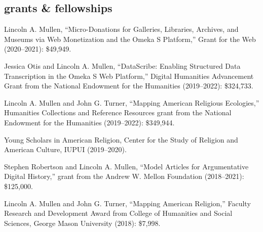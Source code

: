 \documentclass[11pt]{article}
\begin{document}


% 

\subsection{grants \& fellowships}\label{grants-and-fellowships}


Lincoln A. Mullen, ``Micro-Donations for Galleries, Libraries, Archives, and Museums via Web Monetization and the Omeka S Platform,'' Grant for the Web (2020--2021): \$49,949.

Jessica Otis and Lincoln A. Mullen, ``DataScribe: Enabling Structured Data Transcription in the Omeka S Web
Platform,'' Digital Humanities Advancement Grant from the National Endowment for the Humanities (2019--2022): \$324,733.

Lincoln A. Mullen and John G. Turner, ``Mapping American Religious Ecologies,'' Humanities Collections and Reference Resources grant from the National Endowment for the Humanities (2019--2022): \$349,944.

Young Scholars in American Religion, Center for the Study of Religion and American Culture, IUPUI (2019--2020).

Stephen Robertson and Lincoln A. Mullen, ``Model Articles for Argumentative Digital History,'' grant from the Andrew W. Mellon Foundation (2018--2021): \$125,000.

Lincoln A. Mullen and John G. Turner, ``Mapping American Religion,'' Faculty Research and Development Award from College of Humanities and Social Sciences, George Mason University (2018): \$7,998.
\end{document}
